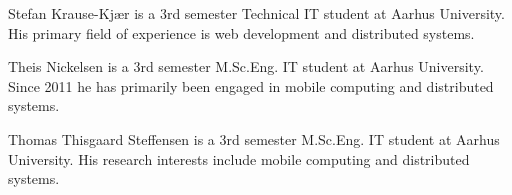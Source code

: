 % 
\vfill\eject

\begin{IEEEbiography}{Stefan Krause-Kj\ae r}
is a 3rd semester Technical IT student at Aarhus University. His primary field of experience is web development and distributed systems.
\end{IEEEbiography}

\begin{IEEEbiography}{Theis Nickelsen}
is a 3rd semester M.Sc.Eng. IT student at Aarhus University. Since 2011 he has primarily been engaged in mobile computing and distributed systems.
\end{IEEEbiography}


\begin{IEEEbiography}{Thomas Thisgaard Steffensen}
is a 3rd semester M.Sc.Eng. IT student at Aarhus University. His research interests include mobile computing and distributed systems.
\end{IEEEbiography}

